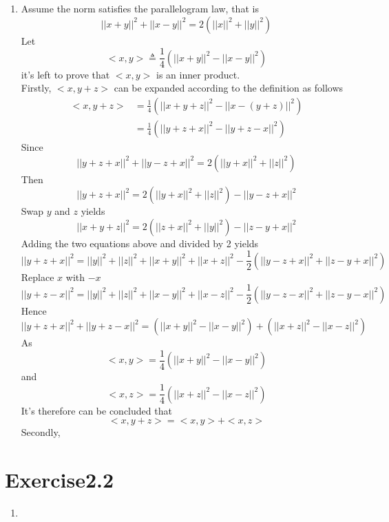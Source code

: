 \documentclass[paper=a4, fontsize=11pt]{scrartcl} %
\numberwithin{equation}{section} %
\numberwithin{figure}{section} %
\numberwithin{table}{section} %
\begin{document}
\begin{enumerate}
		\item 
			Assume the norm satisfies the parallelogram law, that is
			\begin{equation}
				||x+y||^2 + ||x-y||^2 = 2(||x||^2 + ||y||^2)
			\end{equation}
			Let
			\begin{equation}
				<x, y> \triangleq \frac{1}{4}(||x+y||^2 - ||x-y||^2)
			\end{equation}
			it's left to prove that $<x, y>$ is an inner product.\\
			Firstly, $<x, y+z>$ can be expanded according to the definition as follows
			\begin{equation}
				\begin{aligned}
					<x, y+z> & = \frac{1}{4}(||x+y+z||^2 - ||x-(y+z)||^2)\\
					         & = \frac{1}{4}(||y+z+x||^2 - ||y+z-x||^2)
				\end{aligned}
			\end{equation}
			Since
			\begin{equation}
				||y+z+x||^2 + ||y-z+x||^2 = 2(||y+x||^2 + ||z||^2)
			\end{equation}
			Then
			\begin{equation}
				||y+z+x||^2 = 2(||y+x||^2 + ||z||^2) - ||y-z+x||^2
			\end{equation}
			Swap $y$ and $z$ yields
			\begin{equation}
				||x+y+z||^2 = 2(||z+x||^2 + ||y||^2) - ||z-y+x||^2
			\end{equation}
			Adding the two equations above and divided by 2 yields
			\begin{equation}
				||y+z+x||^2 = ||y||^2 + ||z||^2 + ||x+y||^2 + ||x+z||^2 -\frac{1}{2}(||y-z+x||^2 + ||z-y+x||^2)
			\end{equation}
			Replace $x$ with $-x$
			\begin{equation}
				||y+z-x||^2 = ||y||^2 + ||z||^2 + ||x-y||^2 + ||x-z||^2 -\frac{1}{2}(||y-z-x||^2 + ||z-y-x||^2)
			\end{equation}
			Hence
			\begin{equation}
				||y+z+x||^2 + ||y+z-x||^2 = (||x+y||^2 - ||x-y||^2) + (||x+z||^2 - ||x-z||^2)
			\end{equation}
			As
			\begin{equation}
				<x, y> = \frac{1}{4} (||x+y||^2 - ||x-y||^2)
			\end{equation}
			and
			\begin{equation}
				<x, z> = \frac{1}{4} (||x+z||^2 - ||x-z||^2)
			\end{equation}
			It's therefore can be concluded that
			\begin{equation}
				<x, y+z> = <x, y> + <x, z>
			\end{equation}
			Secondly, 
		
	\end{enumerate}

\section{Exercise2.2}
	\begin{enumerate}
		\item
	
	\end{enumerate}
\end{document}
